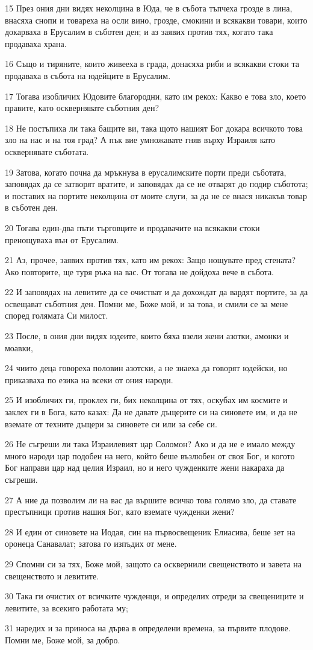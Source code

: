 \par 15 През ония дни видях неколцина в Юда, че в събота тъпчеха грозде в лина, внасяха снопи и товареха на осли вино, грозде, смокини и всякакви товари, които докарваха в Ерусалим в съботен ден; и аз заявих против тях, когато така продаваха храна.
\par 16 Също и тиряните, които живееха в града, донасяха риби и всякакви стоки та продаваха в събота на юдейците в Ерусалим.
\par 17 Тогава изобличих Юдовите благородни, като им рекох: Какво е това зло, което правите, като осквернявате съботния ден?
\par 18 Не постъпиха ли така бащите ви, така щото нашият Бог докара всичкото това зло на нас и на тоя град? А пък вие умножавате гняв върху Израиля като осквернявате съботата.
\par 19 Затова, когато почна да мръкнува в ерусалимските порти преди съботата, заповядах да се затворят вратите, и заповядах да се не отварят до подир съботота; и поставих на портите неколцина от моите слуги, за да не се внася никакъв товар в съботен ден.
\par 20 Тогава един-два пъти търговците и продавачите на всякакви стоки пренощуваха вън от Ерусалим.
\par 21 Аз, прочее, заявих против тях, като им рекох: Защо нощувате пред стената? Ако повторите, ще туря ръка на вас. От тогава не дойдоха вече в събота.
\par 22 И заповядах на левитите да се очистват и да дохождат да вардят портите, за да освещават съботния ден. Помни ме, Боже мой, и за това, и смили се за мене според голямата Си милост.
\par 23 После, в ония дни видях юдеите, които бяха взели жени азотки, амонки и моавки,
\par 24 чиито деца говореха половин азотски, а не знаеха да говорят юдейски, но приказваха по езика на всеки от ония народи.
\par 25 И изобличих ги, проклех ги, бих неколцина от тях, оскубах им космите и заклех ги в Бога, като казах: Да не давате дъщерите си на синовете им, и да не вземате от техните дъщери за синовете си или за себе си.
\par 26 Не съгреши ли така Израилевият цар Соломон? Ако и да не е имало между много народи цар подобен на него, който беше възлюбен от своя Бог, и когото Бог направи цар над целия Израил, но и него чужденките жени накараха да съгреши.
\par 27 А ние да позволим ли на вас да вършите всичко това голямо зло, да ставате престъпници против нашия Бог, като вземате чужденки жени?
\par 28 И един от синовете на Иодая, син на първосвещеник Елиасива, беше зет на оронеца Санавалат; затова го изпъдих от мене.
\par 29 Спомни си за тях, Боже мой, защото са осквернили свещенството и завета на свещенството и левитите.
\par 30 Така ги очистих от всичките чужденци, и определих отреди за свещениците и левитите, за всекиго работата му;
\par 31 наредих и за приноса на дърва в определени времена, за първите плодове. Помни ме, Боже мой, за добро.

